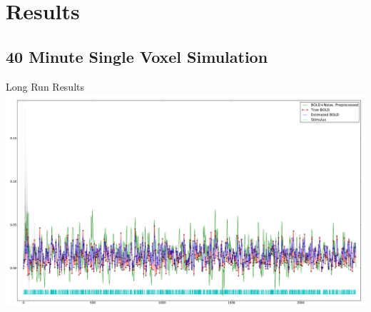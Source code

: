 \documentclass{beamer}
\begin{document}
\section{Results}
\subsection{40 Minute Single Voxel Simulation}
\begin{frame}{Long Run Results}
\includegraphics[width=\textwidth]{long_converge}
\end{frame}
\end{document}
